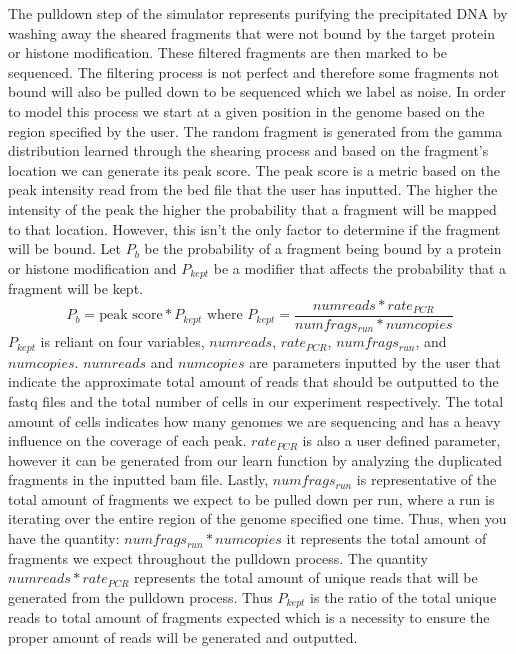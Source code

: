 \documentclass[12pt]{article}
\begin{document}
The pulldown step of the simulator represents purifying the precipitated DNA by washing away the sheared fragments that were not bound by the target protein or histone modification. These filtered fragments are then marked to be sequenced. The filtering process is not perfect and therefore some fragments not bound will also be pulled down to be sequenced which we label as noise. In order to model this process we start at a given position in the genome based on the region specified by the user. The random fragment is generated from the gamma distribution learned through the shearing process and based on the fragment's location we can generate its peak score. The peak score is a metric based on the peak intensity read from the bed file that the user has inputted. The higher the intensity of the peak the higher the probability that a fragment will be mapped to that location. However, this isn't the only factor to determine if the fragment will be bound. Let $P_b$ be the probability of a fragment being bound by a protein or histone modification and $P_{kept}$ be a modifier that affects the probability that a fragment will be kept. 
$$P_b = \text{peak score} * P_{kept} \text{ where } P_{kept} = \dfrac{numreads * rate_{PCR}}{numfrags_{run} * numcopies}$$
$P_{kept}$ is reliant on four variables, $numreads$, $rate_{PCR}$, $numfrags_{run}$, and $numcopies$. $numreads$ and $numcopies$ are parameters inputted by the user that indicate the approximate total amount of reads that should be outputted to the fastq files and the total number of cells in our experiment respectively. The total amount of cells indicates how many genomes we are sequencing and has a heavy influence on the coverage of each peak. $rate_{PCR}$ is also a user defined parameter, however it can be generated from our learn function by analyzing the duplicated fragments in the inputted bam file. Lastly, $numfrags_{run}$ is representative of the total amount of fragments we expect to be pulled down per run, where a run is iterating over the entire region of the genome specified one time. Thus, when you have the quantity: $numfrags_{run}*numcopies$ it represents the total amount of fragments we expect throughout the pulldown process. The quantity $numreads*rate_{PCR}$ represents the total amount of unique reads that will be generated from the pulldown process. Thus $P_{kept}$ is the ratio of the total unique reads to total amount of fragments expected which is a necessity to ensure the proper amount of reads will be generated and outputted. 
\end{document}
